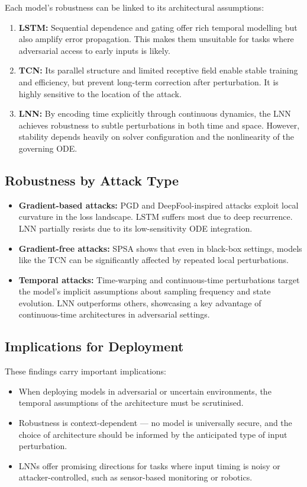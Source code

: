 Each model's robustness can be linked to its architectural assumptions:
\begin{enumerate}
    \item \textbf{LSTM:} Sequential dependence and gating offer rich temporal modelling but also amplify error propagation. This makes them unsuitable for tasks where adversarial access to early inputs is likely.
    \item \textbf{TCN:} Its parallel structure and limited receptive field enable stable training and efficiency, but prevent long-term correction after perturbation. It is highly sensitive to the location of the attack.
    \item \textbf{LNN:} By encoding time explicitly through continuous dynamics, the LNN achieves robustness to subtle perturbations in both time and space. However, stability depends heavily on solver configuration and the nonlinearity of the governing ODE.
\end{enumerate}

\subsection{Robustness by Attack Type}

\begin{itemize}
    \item \textbf{Gradient-based attacks:} PGD and DeepFool-inspired attacks exploit local curvature in the loss landscape. LSTM suffers most due to deep recurrence. LNN partially resists due to its low-sensitivity ODE integration.
    \item \textbf{Gradient-free attacks:} SPSA shows that even in black-box settings, models like the TCN can be significantly affected by repeated local perturbations.
    \item \textbf{Temporal attacks:} Time-warping and continuous-time perturbations target the model's implicit assumptions about sampling frequency and state evolution. LNN outperforms others, showcasing a key advantage of continuous-time architectures in adversarial settings.
\end{itemize}

\subsection{Implications for Deployment}

These findings carry important implications:
\begin{itemize}
    \item When deploying models in adversarial or uncertain environments, the temporal assumptions of the architecture must be scrutinised.
    \item Robustness is context-dependent — no model is universally secure, and the choice of architecture should be informed by the anticipated type of input perturbation.
    \item LNNs offer promising directions for tasks where input timing is noisy or attacker-controlled, such as sensor-based monitoring or robotics.
\end{itemize}

